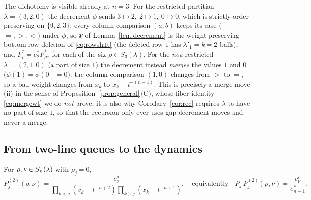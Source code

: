 \begin{qthreeremark}
The dichotomy is visible already at $n=3$. For the restricted partition
$\lambda=(3,2,0)$ the decrement $\phi$ sends $3\mapsto2,\ 2\mapsto1,\ 0\mapsto0$,
which is strictly order-preserving on $\{0,2,3\}$: every column comparison
$(a,b)$ keeps its case ($=,>,<$) under $\phi$, so $\Psi$ of
Lemma~\ref{lem:decrement} is the weight-preserving bottom-row deletion
of \eqref{eq:rowshift} (the deleted row $1$ has $\lambda'_1=k=2$ balls), and
$F^*_\rho=e^*_2 F^*_{\rho^-}$ for each of the six
$\rho\in S_3(\lambda)$. For the \emph{non}-restricted $\lambda=(2,1,0)$ (a part of
size $1$) the decrement instead \emph{merges} the values $1$ and $0$
($\phi(1)=\phi(0)=0$): the column comparison $(1,0)$ changes from $>$ to $=$, so a
ball weight changes from $x_k$ to $x_k-t^{-(n-1)}$. This is precisely a merge move
\textup{(ii)} in the sense of Proposition~\ref{prop:general}\,\textup{(C)}, whose
fiber identity \eqref{eq:mergewt} we do \emph{not} prove; it is also why
Corollary~\ref{cor:rec} requires $\lambda$ to have no part of size $1$, so that the
recursion only ever uses gap-decrement moves and never a merge.
\end{qthreeremark}

\subsection*{From two-line queues to the dynamics}

\begin{qthreeproposition}\label{prop:step2}
For $\rho,\nu\in S_n(\lambda)$ with $\rho_j=0$,
\[
P^{(2)}_j(\rho,\nu)=\frac{c^\rho_\nu}{\prod_{k<j}(x_k-t^{-n+2})\prod_{k>j}(x_k-t^{-n+1})},
\quad\text{equivalently}\quad
P_j\,P^{(2)}_j(\rho,\nu)=\frac{c^\rho_\nu}{e^*_{n-1}} .
\]
\end{qthreeproposition}

